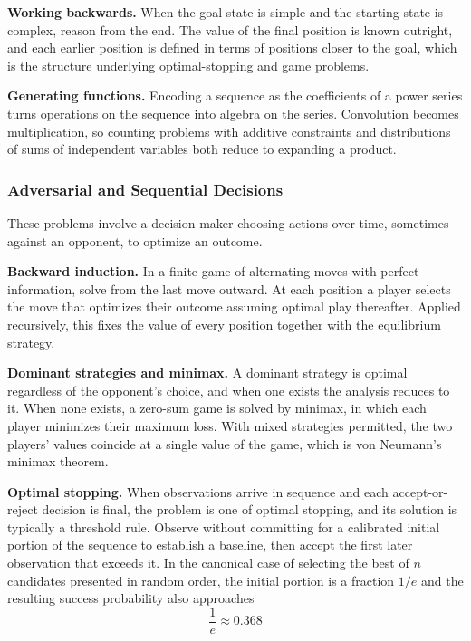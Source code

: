 \textbf{Working backwards.} When the goal state is simple and the starting state is complex, reason from the end. The value of the final position is known outright, and each earlier position is defined in terms of positions closer to the goal, which is the structure underlying optimal-stopping and game problems.

\textbf{Generating functions.} Encoding a sequence as the coefficients of a power series turns operations on the sequence into algebra on the series. Convolution becomes multiplication, so counting problems with additive constraints and distributions of sums of independent variables both reduce to expanding a product.

\subsubsection{Adversarial and Sequential Decisions}

These problems involve a decision maker choosing actions over time, sometimes against an opponent, to optimize an outcome.

\textbf{Backward induction.} In a finite game of alternating moves with perfect information, solve from the last move outward. At each position a player selects the move that optimizes their outcome assuming optimal play thereafter. Applied recursively, this fixes the value of every position together with the equilibrium strategy.

\textbf{Dominant strategies and minimax.} A dominant strategy is optimal regardless of the opponent's choice, and when one exists the analysis reduces to it. When none exists, a zero-sum game is solved by minimax, in which each player minimizes their maximum loss. With mixed strategies permitted, the two players' values coincide at a single value of the game, which is von Neumann's minimax theorem.

\textbf{Optimal stopping.} When observations arrive in sequence and each accept-or-reject decision is final, the problem is one of optimal stopping, and its solution is typically a threshold rule. Observe without committing for a calibrated initial portion of the sequence to establish a baseline, then accept the first later observation that exceeds it. In the canonical case of selecting the best of $n$ candidates presented in random order, the initial portion is a fraction $1/e$ and the resulting success probability also approaches
\[
\frac{1}{e} \approx 0.368
\]

